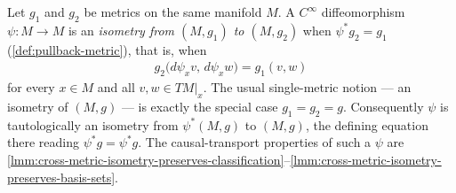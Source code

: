 \begin{definition}
    \label{def:cross-metric-isometry}
    \leanok
    Let $g_1$ and $g_2$ be metrics on the same manifold $M$. A $C^\infty$ diffeomorphism $\psi : M \to M$ is an \emph{isometry from $(M,g_1)$ to $(M,g_2)$} when $\psi^*g_2 = g_1$ (\ref{def:pullback-metric}), that is, when
    \begin{align}
        g_2\big(d\psi_x v,\, d\psi_x w\big) = g_1(v,w)
    \end{align}
    for every $x \in M$ and all $v, w \in TM|_x$. The usual single-metric notion --- an isometry of $(M,g)$ --- is exactly the special case $g_1 = g_2 = g$. Consequently $\psi$ is tautologically an isometry from $\psi^*(M,g)$ to $(M,g)$, the defining equation there reading $\psi^*g = \psi^*g$. The causal-transport properties of such a $\psi$ are \ref{lmm:cross-metric-isometry-preserves-classification}--\ref{lmm:cross-metric-isometry-preserves-basis-sets}.
\end{definition}

